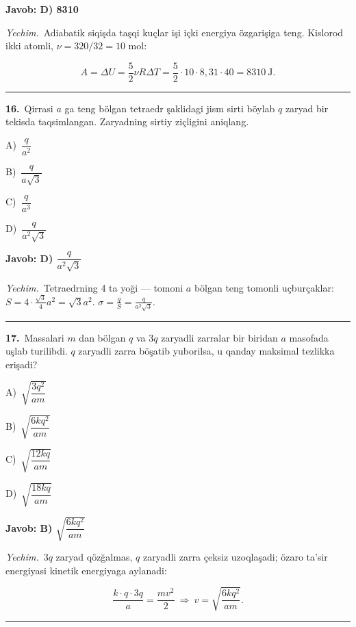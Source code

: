 \documentclass[11pt,a4paper]{article}
\newcommand{\opt}[2]{\hspace*{4mm}#1)\ #2\par}
\begin{document}
\noindent\colorbox{gray!12}{\parbox{\dimexpr\linewidth-2\fboxsep}{\textbf{Javob: D) 8310}}}\par\smallskip
\noindent\textit{Yechim.}\ Adiabatik siqişda taşqi kuçlar işi içki energiya özgarişiga teng. Kislorod ikki atomli, $\nu=320/32=10$ mol:\par
\[A=\Delta U=\frac52\nu R\Delta T=\frac52\cdot10\cdot8{,}31\cdot40=8310\ \text{J}.\]\par\medskip\hrule\medskip
{}\noindent\begin{minipage}{\linewidth}
\textbf{16.}\ Qirrasi $a$ ga teng bölgan tetraedr şaklidagi jism sirti böylab $q$ zaryad bir tekisda taqsimlangan. Zaryadning sirtiy ziçligini aniqlang.\par\smallskip
\opt{A}{$\dfrac{q}{a^2}$}
\opt{B}{$\dfrac{q}{a\sqrt3}$}
\opt{C}{$\dfrac{q}{a^3}$}
\opt{D}{$\dfrac{q}{a^2\sqrt3}$}
\end{minipage}\vspace{2pt}\par
\noindent\colorbox{gray!12}{\parbox{\dimexpr\linewidth-2\fboxsep}{\textbf{Javob: D) $\dfrac{q}{a^2\sqrt3}$}}}\par\smallskip
\noindent\textit{Yechim.}\ Tetraedrning 4 ta yoği — tomoni $a$ bölgan teng tomonli uçburçaklar: $S=4\cdot\frac{\sqrt3}{4}a^2=\sqrt3a^2$. $\sigma=\frac{q}{S}=\frac{q}{a^2\sqrt3}$.\par\par\medskip\hrule\medskip
{}\noindent\begin{minipage}{\linewidth}
\textbf{17.}\ Massalari $m$ dan bölgan $q$ va $3q$ zaryadli zarralar bir biridan $a$ masofada uşlab turilibdi. $q$ zaryadli zarra böşatib yuborilsa, u qanday maksimal tezlikka erişadi?\par\smallskip
\opt{A}{$\sqrt{\dfrac{3q^2}{am}}$}
\opt{B}{$\sqrt{\dfrac{6kq^2}{am}}$}
\opt{C}{$\sqrt{\dfrac{12kq}{am}}$}
\opt{D}{$\sqrt{\dfrac{18kq}{am}}$}
\end{minipage}\vspace{2pt}\par
\noindent\colorbox{gray!12}{\parbox{\dimexpr\linewidth-2\fboxsep}{\textbf{Javob: B) $\sqrt{\dfrac{6kq^2}{am}}$}}}\par\smallskip
\noindent\textit{Yechim.}\ $3q$ zaryad qözğalmas, $q$ zaryadli zarra çeksiz uzoqlaşadi; özaro ta’sir energiyasi kinetik energiyaga aylanadi:\par
\[\frac{k\cdot q\cdot3q}{a}=\frac{mv^2}{2}\ \Rightarrow\ v=\sqrt{\frac{6kq^2}{am}}.\]\par\medskip\hrule\medskip
\end{document}
